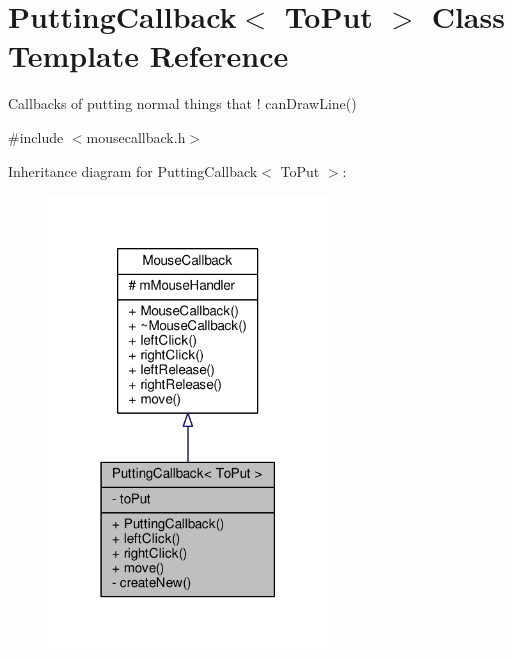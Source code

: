 \hypertarget{classPuttingCallback}{}\section{Putting\+Callback$<$ To\+Put $>$ Class Template Reference}
\label{classPuttingCallback}


Callbacks of putting normal things that ! can\+Draw\+Line()  




{\ttfamily \#include $<$mousecallback.\+h$>$}



Inheritance diagram for Putting\+Callback$<$ To\+Put $>$\+:
\nopagebreak
\begin{figure}[H]
\begin{center}
\leavevmode
\includegraphics[width=210pt]{classPuttingCallback__inherit__graph}
\end{center}
\end{figure}


